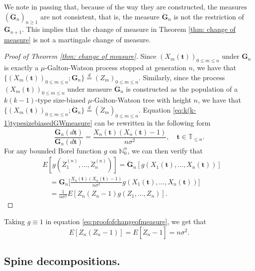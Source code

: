 \documentclass[12pt,a4paper]{amsart}
\numberwithin{equation}{section}
\begin{document}
	We note in passing that, because of the way they are constructed, the measures $(\ddot{\mathbf G}_n)_{n\ge 1}$ are not consistent, that is, the measure $\ddot{\mathbf G}_n$ is not the restriction of $\ddot{\mathbf G}_{n+1}$.
	This implies that the change of measure in Theorem \ref{thm: change of measure} is not a martingale change of measure.
\medskip
\begin{proof}[Proof of Theorem \ref{thm: change of measure}]
	Since $(X_m( \mathbf t ))_{0\le m\le n}$ under ${\mathbf G}_n$ is exactly a $\mu$-Galton-Watson process stopped at generation $n$, we have that $\{(X_m( \mathbf t ))_{0\le m\le n}; {\mathbf G}_n\}  \overset{d}{=} (Z_m)_{0\le m\le n}.$
    Similarly, since the process $(X_m( \mathbf t ))_{0\le m\le n}$ under measure $\ddot{\mathbf G}_n$ is constructed as the population of a $k(k-1)$-type size-biased $\mu$-Galton-Watson tree with height $n$, we have that $\{(X_m( \mathbf t ))_{0\le m\le n};\ddot{\mathbf G}_n\}  \overset{d}{=} (\ddot Z_m)_{0\le m\le n}.$
	Equation \eqref{eq:k(k-1)typesizebiasedGWmeasure} can be rewritten in the following form
\begin{equation*}
    	\frac{\ddot{\mathbf G}_n(d \mathbf t )}{\mathbf G_n (d \mathbf t ) }
    =
    	\frac{X_n( \mathbf t )(X_n( \mathbf t )-1)}{n\sigma^2},
    \quad
    	 \mathbf t \in \mathbb T_{\leq n}.
\end{equation*}
    For any bounded Borel function $g$ on $\mathbb N_0^n$, we can then verify that
\begin{equation} \label{eq:proofofchangeofmeasure}
\begin{split}
	&E [ g ( \ddot Z_1^{(n)}, \dots, \ddot Z_n^{(n)})]
	= \ddot{\mathbf G}_n [g ( X_1(  \mathbf t ), \dots, X_n(  \mathbf t ))]
    \\ &\quad = {\mathbf G}_n \big[ \frac { X_n( \mathbf t ) ( X_n( \mathbf t ) - 1)} {n \sigma^2} g (X_1( \mathbf t ), \dots, X_n( \mathbf t ))\big]
	\\&\quad = \frac { 1} { n \sigma^2} E[ Z_n ( Z_n - 1) g( Z_1, \dots, Z_n)].
\end{split}
\end{equation}
\end{proof}
	Taking $g\equiv 1$ in equation \eqref{eq:proofofchangeofmeasure}, we get that
\begin{equation}
	\label{eq: second moment}
	E [Z_n(Z_n-1)]= E [\dot Z_n - 1]= n\sigma^2.
\end{equation}
\subsection{Spine decompositions.}
\label{sec:spinesdecomposition}
\end{document}
